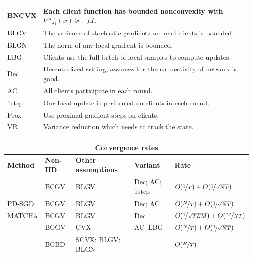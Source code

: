 \documentclass[11pt]{article}
\begin{document}
\begin{table}
\begin{center}
\begin{tabularx}{\textwidth}{lX}
  BNCVX & Each client function has bounded nonconvexity with $\nabla^2 f_i(x) \succeq -\mu I $. \\
  \hline
  BLGV & The variance of stochastic gradients on local clients is bounded. \\
  BLGN & The norm of any local gradient is bounded. \\
  LBG & Clients use the full batch of local samples to compute updates. \\
  \hline
  Dec & Decentralized setting, assumes the the connectivity of network is good. \\
  AC & All clients participate in each round. \\
  1step & One local update is performed on clients in each round. \\
  Prox & Use proximal gradient steps on clients. \\
  VR & Variance reduction which needs to track the state. \\
\bottomrule
\end{tabularx}
\vspace{0.5cm}
\begin{tabularx}{\textwidth}{llllX}
\multicolumn{5}{c}{\textbf{Convergence rates}}\\
\toprule
\textbf{Method} & \textbf{Non-IID} & \textbf{Other assumptions} & \textbf{Variant} & \textbf{Rate} \\
\midrule
\citet{Lian2017b} & BCGV  &  BLGV &  Dec; AC; 1step & $O(\nicefrac{1}{T}) + O(\nicefrac{1}{\sqrt{NT}})$\\
\hline
PD-SGD \citep{li2019communication} & BCGV & BLGV & Dec; AC & $O(\nicefrac{N}{T}) + O(\nicefrac{1}{\sqrt{NT}})$ \\
\hline
MATCHA \citep{wang2019matcha} & BCGV & BLGV & Dec & $O(\nicefrac{1}{\sqrt{TKM}}) + O(\nicefrac{M}{KT})$ \\
\hline
\citet{khaled2019analysis} &  BOGV   & CVX & AC; LBG & $O(\nicefrac{N}{T}) + O(\nicefrac{1}{\sqrt{NT}})$\\
\hline
\citet{li2019convergence} & BOBD & SCVX; BLGV; BLGN & - & $O(\nicefrac{K}{T})$\\
\hline

\end{tabularx}
\end{center}
\end{table}
\end{document}

